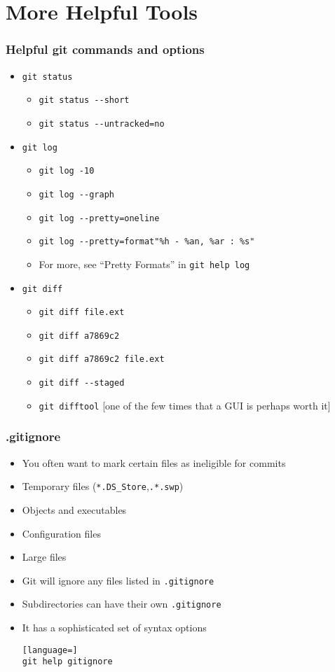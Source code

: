 \documentclass{beamer}
\begin{document}
\section{More Helpful Tools}
\begin{frame}[fragile]
\frametitle{Helpful git commands and options}
\begin{itemize}
\item \lstinline{git status}
\begin{itemize}
\item \lstinline{git status --short}
\item \lstinline{git status --untracked=no}
\end{itemize}
\item \lstinline{git log}
\begin{itemize}
\item \lstinline{git log -10}
\item \lstinline{git log --graph}
\item \lstinline{git log --pretty=oneline}
\item \lstinline{git log --pretty=format"%h - %an, %ar : %s"}
\item For more, see ``Pretty Formats'' in \lstinline{git help log}
\end{itemize}
\item \lstinline{git diff}
\begin{itemize}
\item \lstinline{git diff file.ext}
\item \lstinline{git diff a7869c2}
\item \lstinline{git diff a7869c2 file.ext}
\item \lstinline{git diff --staged}
\item \lstinline{git difftool} [one of the few times that a GUI is perhaps worth it]
\end{itemize}
\end{itemize}
\end{frame}

\begin{frame}[fragile]
\frametitle{.gitignore}
\begin{itemize}
\item You often want to mark certain files as ineligible for commits
\item Temporary files (\lstinline{*.DS_Store},\lstinline{.*.swp})
\item Objects and executables
\item Configuration files
\item Large files
\item Git will ignore any files listed in \lstinline{.gitignore}
\item Subdirectories can have their own \lstinline{.gitignore}
\item It has a sophisticated set of syntax options
\begin{lstlisting}[language=]
git help gitignore
\end{lstlisting}
\end{itemize}
\end{frame}
\end{document}
